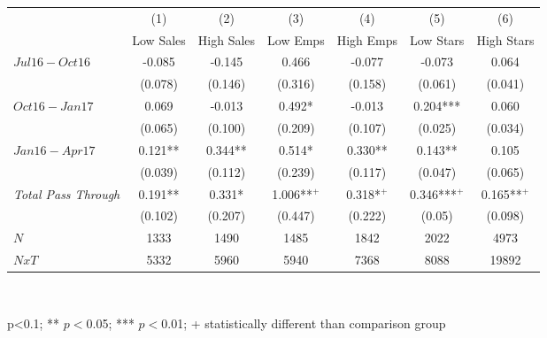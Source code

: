 \begin{center}
\begin{tabular}{l cccccc}
\hline  & (1) & (2) & (3) & (4) & (5) & (6)\\
 & Low Sales & High Sales & Low Emps & High Emps & Low Stars & High Stars\\
\hline  $ Jul16-Oct16 $  & -0.085 & -0.145 & 0.466 & -0.077 & -0.073 & 0.064\\
 & (0.078) & (0.146) & (0.316) & (0.158) & (0.061) & (0.041)\\
 $ Oct16-Jan17 $  & 0.069 & -0.013 & 0.492* & -0.013 & 0.204*** & 0.060\\
 & (0.065) & (0.100) & (0.209) & (0.107) & (0.025) & (0.034)\\
 $ Jan16-Apr17 $  & 0.121** & 0.344** & 0.514* & 0.330** & 0.143** & 0.105\\
 & (0.039) & (0.112) & (0.239) & (0.117) & (0.047) & (0.065)\\
\hline \textit{Total Pass Through} & 0.191** & 0.331* & 1.006**$^+$ & 0.318*$^+$ & 0.346***$^+$ & 0.165**$^+$\\
  & (0.102) & (0.207) & (0.447) & (0.222) & (0.05) & (0.098)\\
\hline  $ N $  & 1333 & 1490 & 1485 & 1842 & 2022 & 4973\\
 $ NxT $  & 5332 & 5960 & 5940 & 7368 & 8088 & 19892\\
\hline\end{tabular}\\
\begin{tiny}p<0.1; ** $p<0$.05; *** $p<0$.01; + statistically different than comparison group\end{tiny}\\
\end{center}
